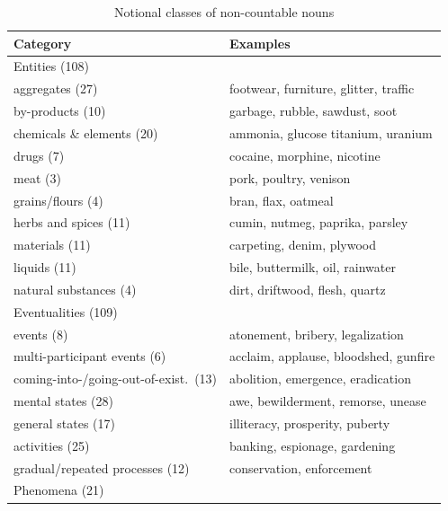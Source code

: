 \documentclass[output=paper]{langscibook}
\begin{document}
\begin{table}
\caption{Notional classes of non-countable nouns}
\label{gri-ric:tab:1:Notional}
 \begin{tabular}{ll} 
  \lsptoprule
    {Category}    &{Examples}\\ 
  \midrule
  \multicolumn{2}{l}{Entities (108)}\\  \midrule
    aggregates (27)  &   footwear, furniture, glitter, traffic \\
  by-products (10)  &  garbage, rubble, sawdust, soot \\
  chemicals \& elements (20) & ammonia, glucose titanium, uranium  \\
  drugs (7)  &   cocaine, morphine, nicotine \\
  meat (3)  &  pork, poultry, venison \\	
  grains/flours (4) &  bran, flax, oatmeal   \\
  herbs and spices (11) &   cumin, nutmeg, paprika, parsley \\
  materials (11) &   carpeting, denim, plywood \\ 
  liquids (11)  &  bile, buttermilk, oil, rainwater \\ 
  natural substances (4) & dirt, driftwood, flesh, quartz \\\midrule
  \multicolumn{2}{l}{{Eventualities (109)}} \\\midrule
   events  (8) &   atonement, bribery,  legalization \\
  multi-participant events	 (6) & acclaim, applause, bloodshed, gunfire \\
  coming-into-/going-out-of-exist.~(13) & abolition, emergence, eradication\\
  mental states	(28)  & awe, bewilderment, remorse, unease \\
  general states (17)& illiteracy, prosperity, puberty    \\
  activities (25) & banking, espionage, gardening \\
  gradual/repeated processes (12) & conservation, enforcement \\\midrule  
 \multicolumn{2}{l}{{Phenomena (21)}}\\\midrule

\end{tabular}
\end{table}
\end{document}
